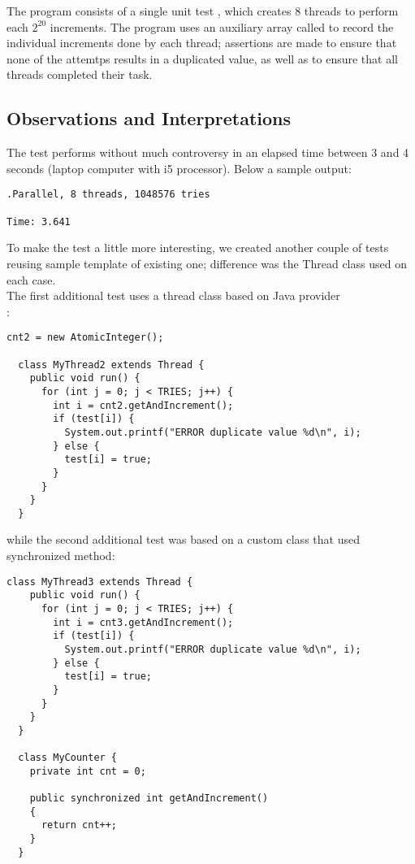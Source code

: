 The program consists of a single unit test ,
which creates 8 threads to perform each $2^20$ increments. The program
uses an auxiliary array called  to record the individual
increments done by each thread; assertions are made to ensure that
none of the attemtps results in a duplicated value, as well as to
ensure that all threads completed their task.

\subsection{Observations and Interpretations}

The test performs without much controversy in an elapsed time between
3 and 4 seconds (laptop computer with i5 processor). Below a sample
output: 

\begin{verbatim}
.Parallel, 8 threads, 1048576 tries

Time: 3.641
\end{verbatim}

To make the test a little more interesting, we created another couple
of tests reusing sample template of existing one; difference was the
Thread class used on each case. \\

The first additional test uses a thread class based on Java provider \\
: \\

\begin{lstlisting}[style=nonumbers]
  cnt2 = new AtomicInteger();

  class MyThread2 extends Thread {
    public void run() {
      for (int j = 0; j < TRIES; j++) {
        int i = cnt2.getAndIncrement();
        if (test[i]) {
          System.out.printf("ERROR duplicate value %d\n", i);
        } else {
          test[i] = true;
        }
      }
    }        
  }
\end{lstlisting}
\hfill

while the second additional test was based on a custom class that used
synchronized  method:\\

\begin{lstlisting}[style=nonumbers]
  class MyThread3 extends Thread {
    public void run() {
      for (int j = 0; j < TRIES; j++) {
        int i = cnt3.getAndIncrement();
        if (test[i]) {
          System.out.printf("ERROR duplicate value %d\n", i);
        } else {
          test[i] = true;
        }
      }
    }        
  }

  class MyCounter {
    private int cnt = 0;

    public synchronized int getAndIncrement()
    {
      return cnt++;
    }
  }
\end{lstlisting}
\hfill

